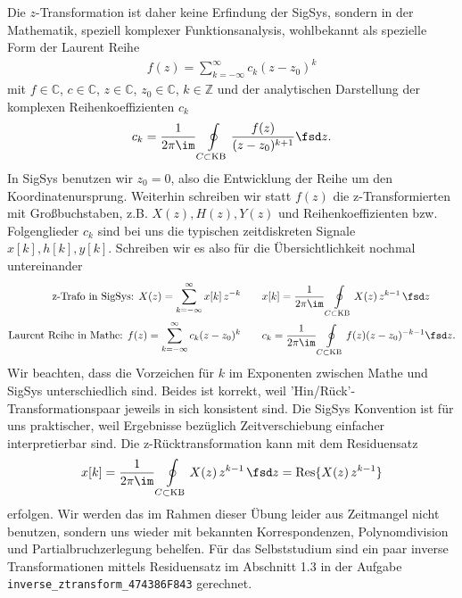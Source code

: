 %
Die $z$-Transformation ist daher keine Erfindung der SigSys, sondern in der
Mathematik, speziell komplexer Funktionsanalysis, wohlbekannt als spezielle
Form der Laurent Reihe~\cite[S.\,56ff]{Wunsch1972}
\begin{align}
f(z) = \sum_{k=-\infty}^{\infty} c_k (z - z_0)^k
\end{align}
mit $f\in\mathbb{C}$, $c\in\mathbb{C}$, $z\in\mathbb{C}$, $z_0\in\mathbb{C}$, $k\in\mathbb{Z}$
und der analytischen Darstellung der komplexen Reihenkoeffizienten $c_k$
\begin{align}
c_k = \frac{1}{2\pi\im}\oint\limits_{C \subset \text{KB}}
\frac{f(z)}{(z-z_0)^{k+1}}\fsd z.
\end{align}
%
In SigSys benutzen wir $z_0=0$, also die Entwicklung der Reihe um den
Koordinatenursprung.
%
Weiterhin schreiben wir statt $f(z)$ die z-Transformierten mit Großbuchstaben,
z.B. $X(z), H(z), Y(z)$ und Reihenkoeffizienten bzw. Folgenglieder $c_k$
sind bei uns die typischen
zeitdiskreten Signale $x[k], h[k], y[k]$.
%
Schreiben wir es also für die Übersichtlichkeit nochmal untereinander
\begin{align}
\text{z-Trafo in SigSys:   } X(z) = \sum_{k=-\infty}^{\infty} x[k] \, z^{-k}\qquad
&x[k] = \frac{1}{2\pi \im} \oint\limits_{C \subset \text{KB}} X(z) \, z^{k-1} \, \fsd z\\
\text{Laurent Reihe in Mathe:   } f(z) = \sum_{k=-\infty}^{\infty} c_k (z - z_0)^k\qquad
&c_k = \frac{1}{2\pi\im}\oint\limits_{C \subset \text{KB}}
f(z) (z-z_0)^{-k-1}\fsd z.
\end{align}
Wir beachten, dass die Vorzeichen für $k$ im Exponenten zwischen Mathe und SigSys
unterschiedlich sind.
%
Beides ist korrekt, weil 'Hin/Rück'-Transformationspaar jeweils in sich
konsistent sind.
%
Die SigSys Konvention ist für uns praktischer, weil Ergebnisse
bezüglich Zeitverschiebung einfacher interpretierbar sind.
%
Die z-Rücktransformation kann mit dem Residuensatz
\begin{align}
x[k] = \frac{1}{2\pi \im} \oint\limits_{C \subset \text{KB}} X(z) \, z^{k-1} \, \fsd z
= \text{Res}\{X(z) \, z^{k-1}\}
\end{align}
erfolgen.
%
Wir werden das im Rahmen dieser Übung leider
aus Zeitmangel nicht benutzen, sondern uns wieder mit bekannten Korrespondenzen,
Polynomdivision und Partialbruchzerlegung behelfen.
%
Für das Selbststudium sind ein paar inverse Transformationen mittels Residuensatz
im Abschnitt 1.3 in der Aufgabe \texttt{inverse\_ztransform\_474386F843}
gerechnet.


